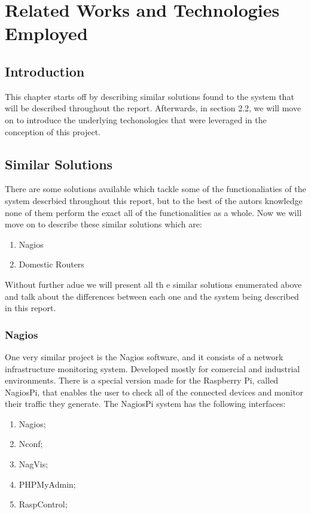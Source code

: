 \chapter{Related Works and Technologies Employed}
\label{chap:related-material}

\section{Introduction}
\label{chap2:sec:intro}
This chapter starts off by describing similar solutions found to the system that
will be described throughout the report. Afterwards, in section 2.2, we will
move on to introduce the underlying techonologies that were leveraged in the
conception of this project.

\section{Similar Solutions}
\label{chap2:sec:similar-sol}
There are some solutions available which tackle some of the functionaliaties of
the system descrbied throughout this report, but to the best of the autors
knowledge none of them perform the exact all of the functionalities as a whole.
Now we will move on to describe these similar solutions which are:
\begin{enumerate}
	\item Nagios
	\item Domestic Routers
\end{enumerate}

Without further adue we will present all th e similar solutions enumerated above
and talk about the differences between each one and the system being described
in this report.

\subsection{Nagios}
\label{chap2:sec:similar-sol:sub:nagios}
One very similar project is the Nagios software, and it consists of a network
infrastructure monitoring system. Developed mostly for comercial and industrial
environments. There is a special version made for the Raspberry Pi, called
NagiosPi, that enables the user to check all of the connected devices and
monitor their traffic they generate. The NagiosPi system has the following
interfaces:
\begin{enumerate}
	\item Nagios;
	\item Nconf;
	\item NagVis;
	\item PHPMyAdmin;
	\item RaspControl;
\end{enumerate}

